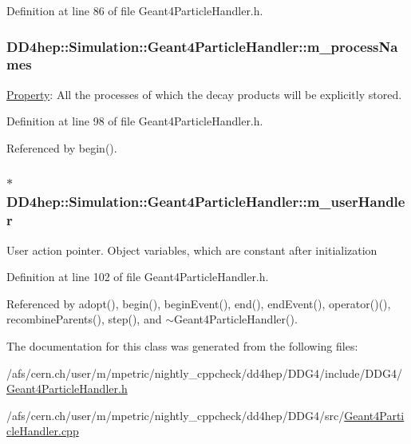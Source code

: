 Definition at line 86 of file Geant4ParticleHandler.h.\hypertarget{class_d_d4hep_1_1_simulation_1_1_geant4_particle_handler_a86ffc05d00b981f7225c2cc6565e7739}{
\subsubsection[{m\_\-processNames}]{ {\bf DD4hep::Simulation::Geant4ParticleHandler::m\_\-processNames}}}
\label{class_d_d4hep_1_1_simulation_1_1_geant4_particle_handler_a86ffc05d00b981f7225c2cc6565e7739}


\hyperlink{class_d_d4hep_1_1_property}{Property}: All the processes of which the decay products will be explicitly stored. 

Definition at line 98 of file Geant4ParticleHandler.h.

Referenced by begin().\hypertarget{class_d_d4hep_1_1_simulation_1_1_geant4_particle_handler_a6614f131fd012f3e1aa7f13576baf256}{
\subsubsection[{m\_\-userHandler}]{$\ast$ {\bf DD4hep::Simulation::Geant4ParticleHandler::m\_\-userHandler}}}
\label{class_d_d4hep_1_1_simulation_1_1_geant4_particle_handler_a6614f131fd012f3e1aa7f13576baf256}


User action pointer. Object variables, which are constant after initialization 

Definition at line 102 of file Geant4ParticleHandler.h.

Referenced by adopt(), begin(), beginEvent(), end(), endEvent(), operator()(), recombineParents(), step(), and $\sim$Geant4ParticleHandler().

The documentation for this class was generated from the following files:\begin{DoxyCompactItemize}
\item 
/afs/cern.ch/user/m/mpetric/nightly\_\-cppcheck/dd4hep/DDG4/include/DDG4/\hyperlink{_geant4_particle_handler_8h}{Geant4ParticleHandler.h}\item 
/afs/cern.ch/user/m/mpetric/nightly\_\-cppcheck/dd4hep/DDG4/src/\hyperlink{_geant4_particle_handler_8cpp}{Geant4ParticleHandler.cpp}\end{DoxyCompactItemize}
